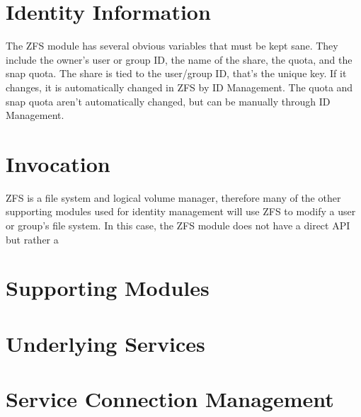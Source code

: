 \documentclass[letterpaper,12pt,titlepage]{article}
\begin{document}
\section{Identity Information}
The ZFS module has several obvious variables that must be kept sane. They include the owner's user or group ID, the name of the share, the quota, and the snap quota. The share is tied to the user/group ID, that's the unique key. If it changes, it is automatically changed in ZFS by ID Management. The quota and snap quota aren't automatically changed, but can be manually through ID Management. 


\section{Invocation}
ZFS is a file system and logical volume manager, therefore many of the other
supporting modules used for identity management will use ZFS to modify
a user or group's file system. In this case, the ZFS module does not have a
direct API but rather a 


\section{Supporting Modules}


\section{Underlying Services}

\section{Service Connection Management}
\end{document}
